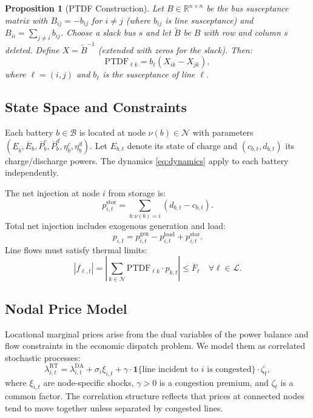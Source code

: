\documentclass[11pt]{article}
\newtheorem{proposition}{Proposition}
\begin{document}
\begin{proposition}[PTDF Construction]
Let $B \in \mathbb{R}^{n \times n}$ be the bus susceptance matrix with $B_{ij} = -b_{ij}$ for $i \neq j$ (where $b_{ij}$ is line susceptance) and $B_{ii} = \sum_{j \neq i} b_{ij}$. Choose a slack bus $s$ and let $\tilde{B}$ be $B$ with row and column $s$ deleted. Define $X = \tilde{B}^{-1}$ (extended with zeros for the slack). Then:
\begin{equation}
    \text{PTDF}_{\ell k} = b_\ell (X_{ik} - X_{jk}),
\end{equation}
where $\ell = (i,j)$ and $b_\ell$ is the susceptance of line $\ell$.
\end{proposition}

\subsection{State Space and Constraints}

Each battery $b \in \mathcal{B}$ is located at node $\nu(b) \in \mathcal{N}$ with parameters $(\underline{E}_b, \overline{E}_b, \overline{P}^c_b, \overline{P}^d_b, \eta^c_b, \eta^d_b)$. Let $E_{b,t}$ denote its state of charge and $(c_{b,t}, d_{b,t})$ its charge/discharge powers. The dynamics \eqref{eq:dynamics} apply to each battery independently.

The net injection at node $i$ from storage is:
\begin{equation}
    p^{\text{stor}}_{i,t} = \sum_{b : \nu(b) = i} (d_{b,t} - c_{b,t}).
\end{equation}
Total net injection includes exogenous generation and load:
\begin{equation}
    p_{i,t} = p^{\text{gen}}_{i,t} - p^{\text{load}}_{i,t} + p^{\text{stor}}_{i,t}.
\end{equation}
Line flows must satisfy thermal limits:
\begin{equation}\label{eq:flow_limits}
    |f_{\ell,t}| = \left|\sum_{k \in \mathcal{N}} \text{PTDF}_{\ell k} \cdot p_{k,t}\right| \leq \overline{F}_\ell \quad \forall \ell \in \mathcal{L}.
\end{equation}

\subsection{Nodal Price Model}

Locational marginal prices arise from the dual variables of the power balance and flow constraints in the economic dispatch problem. We model them as correlated stochastic processes:
\begin{equation}\label{eq:lmp}
    \lambda^{\text{RT}}_{i,t} = \lambda^{\text{DA}}_{i,t} + \sigma_i \xi_{i,t} + \gamma \cdot \mathbf{1}\{\text{line incident to } i \text{ is congested}\} \cdot \zeta_t,
\end{equation}
where $\xi_{i,t}$ are node-specific shocks, $\gamma > 0$ is a congestion premium, and $\zeta_t$ is a common factor. The correlation structure reflects that prices at connected nodes tend to move together unless separated by congested lines.
\end{document}
